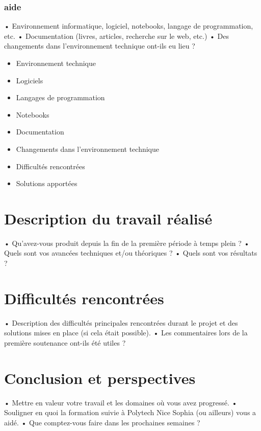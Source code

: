 \documentclass[11pt]{article}
\begin{document}
\subsubsection*{aide}

•	Environnement informatique, logiciel, notebooks, langage de programmation, etc.
•	Documentation (livres, articles, recherche sur le web, etc.)
•	Des changements dans l’environnement technique ont-ils eu lieu ?

\begin{itemize}
  \item Environnement technique
  \item Logiciels
  \item Langages de programmation
  \item Notebooks
  \item Documentation
  \item Changements dans l'environnement technique
  \item Difficultés rencontrées
  \item Solutions apportées
\end{itemize}

\pagebreak

\section{Description du travail réalisé}

•	Qu’avez-vous produit depuis la fin de la première période à temps plein ?
•	Quels sont vos avancées techniques et/ou théoriques ?
•	Quels sont vos résultats ?


\pagebreak

\section{Difficultés rencontrées}

•	Description des difficultés principales rencontrées durant le projet et des solutions mises en place (si cela était possible).
•	Les commentaires lors de la première soutenance ont-ils été utiles ?

\pagebreak

\section{Conclusion et perspectives}

•	Mettre en valeur votre travail et les domaines où vous avez progressé.
•	Souligner en quoi la formation suivie à Polytech Nice Sophia (ou ailleurs) vous a aidé.
•	Que comptez-vous faire dans les prochaines semaines ?

\pagebreak

\listoffigures

\pagebreak



\end{document}
